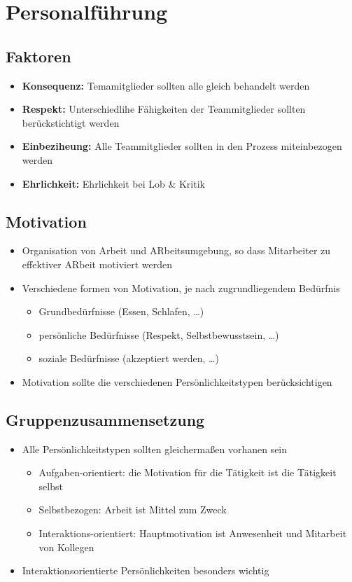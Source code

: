 \section{Personalführung}
\subsection{Faktoren}
\begin{itemize}
    \item \textbf{Konsequenz:} Temamitglieder sollten alle gleich behandelt werden 
    \item \textbf{Respekt:} Unterschiedlihe Fähigkeiten der Teammitglieder sollten berückstichtigt werden 
    \item \textbf{Einbeziheung:} Alle Teammitglieder sollten in den Prozess miteinbezogen werden
    \item \textbf{Ehrlichkeit:} Ehrlichkeit bei Lob \& Kritik
\end{itemize}

\subsection{Motivation}
\begin{itemize}
    \item Organisation von Arbeit und ARbeitsumgebung, so dass Mitarbeiter zu effektiver ARbeit motiviert werden 
    \item Verschiedene formen von Motivation, je nach zugrundliegendem Bedürfnis
    \begin{itemize}
        \item Grundbedürfnisse (Essen, Schlafen, \dots)
        \item persönliche Bedürfnisse (Respekt, Selbstbewusstsein, \dots)
        \item soziale Bedürfnisse (akzeptiert werden, \dots)
    \end{itemize}
    \item Motivation sollte die verschiedenen Persönlichkeitstypen berücksichtigen
\end{itemize}

\subsection{Gruppenzusammensetzung}
\begin{itemize}
    \item Alle Persönlichkeitstypen sollten gleichermaßen vorhanen sein
    \begin{itemize}
        \item Aufgaben-orientiert: die Motivation für die Tätigkeit ist die Tätigkeit selbst
        \item Selbstbezogen: Arbeit ist Mittel zum Zweck
        \item Interaktions-orientiert: Hauptmotivation ist Anwesenheit und Mitarbeit von Kollegen
    \end{itemize}
    \item Interaktionsorientierte Persönlichkeiten besonders wichtig
\end{itemize}

